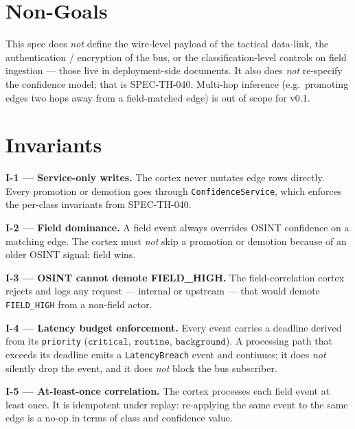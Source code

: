 \section{Non-Goals}
\begin{nongoal}
This spec does \emph{not} define the wire-level payload of the tactical data-link, the authentication / encryption of the bus, or the classification-level controls on field ingestion --- those live in deployment-side documents. It also does \emph{not} re-specify the confidence model; that is SPEC-TH-040. Multi-hop inference (e.g.\ promoting edges two hops away from a field-matched edge) is out of scope for v0.1.
\end{nongoal}

\section{Invariants}

\begin{invariant}
\textbf{I-1 --- Service-only writes.} The cortex never mutates edge rows directly. Every promotion or demotion goes through \texttt{ConfidenceService}, which enforces the per-class invariants from SPEC-TH-040.
\end{invariant}

\begin{invariant}
\textbf{I-2 --- Field dominance.} A field event always overrides OSINT confidence on a matching edge. The cortex must \emph{not} skip a promotion or demotion because of an older OSINT signal; field wins.
\end{invariant}

\begin{invariant}
\textbf{I-3 --- OSINT cannot demote FIELD\_HIGH.} The field-correlation cortex rejects and logs any request --- internal or upstream --- that would demote \texttt{FIELD\_HIGH} from a non-field actor.
\end{invariant}

\begin{invariant}
\textbf{I-4 --- Latency budget enforcement.} Every event carries a deadline derived from its \texttt{priority} ($\texttt{critical}$, $\texttt{routine}$, $\texttt{background}$). A processing path that exceeds its deadline emits a \texttt{LatencyBreach} event and continues; it does \emph{not} silently drop the event, and it does \emph{not} block the bus subscriber.
\end{invariant}

\begin{invariant}
\textbf{I-5 --- At-least-once correlation.} The cortex processes each field event at least once. It is idempotent under replay: re-applying the same event to the same edge is a no-op in terms of class and confidence value.
\end{invariant}


